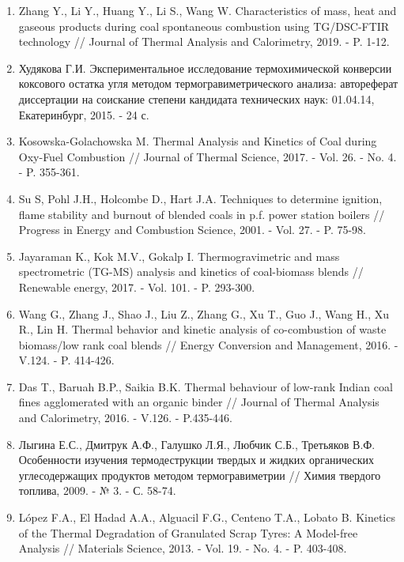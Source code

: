 \begin{enumerate}
\item
Zhang Y., Li Y., Huang Y., Li S., Wang W. Characteristics of mass,
heat and gaseous products during coal spontaneous combustion using
TG/DSC-FTIR technology // Journal of Thermal Analysis and Calorimetry,
2019. - P. 1-12.

\item
Худякова Г.И. Экспериментальное исследование термохимической
конверсии коксового остатка угля методом термогравиметрического анализа:
автореферат диссертации на соискание степени кандидата технических наук:
01.04.14, Екатеринбург, 2015. - 24 с.

\item
Kosowska-Golachowska M. Thermal Analysis and Kinetics of Coal during
Oxy-Fuel Combustion // Journal of Thermal Science, 2017. - Vol. 26. -
No. 4. - P. 355-361.

\item
Su S, Pohl J.H., Holcombe D., Hart J.A. Techniques to determine
ignition, flame stability and burnout of blended coals in p.f. power
station boilers // Progress in Energy and Combustion Science, 2001. -
Vol. 27. - P. 75-98.

\item
Jayaraman K., Kok M.V., Gokalp I. Thermogravimetric and mass
spectrometric (TG-MS) analysis and kinetics of coal-biomass blends //
Renewable energy, 2017. - Vol. 101. - P. 293-300.

\item
Wang G., Zhang J., Shao J., Liu Z., Zhang G., Xu T., Guo J., Wang H.,
Xu R., Lin H. Thermal behavior and kinetic analysis of co-combustion of
waste biomass/low rank coal blends // Energy Conversion and Management,
2016. - V.124. - P. 414-426.

\item
Das T., Baruah B.P., Saikia B.K. Thermal behaviour of low-rank Indian
coal fines agglomerated with an organic binder // Journal of Thermal
Analysis and Calorimetry, 2016. - V.126. - P.435-446.

\item
Лыгина Е.С., Дмитрук А.Ф., Галушко Л.Я., Любчик С.Б., Третьяков В.Ф.
Особенности изучения термодеструкции твердых и жидких органических
углесодержащих продуктов методом термогравиметрии // Химия твердого
топлива, 2009. - № 3. - С. 58-74.

\item
López F.A., El Hadad A.A., Alguacil F.G., Centeno T.A., Lobato B.
Kinetics of the Thermal Degradation of Granulated Scrap Tyres: A
Model-free Analysis // Materials Science, 2013. - Vol. 19. - No. 4. -
P. 403-408.


\end{enumerate}
